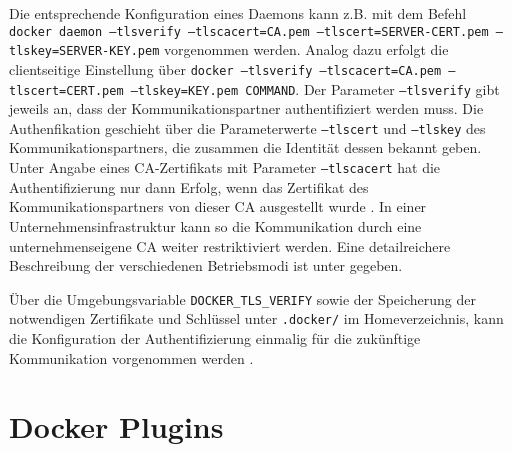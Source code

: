 \documentclass[../main.tex]{subfiles}
\begin{document}
    Die entsprechende Konfiguration eines Daemons kann z.B. mit dem Befehl \texttt{docker daemon --tlsverify --tlscacert=CA.pem --tlscert=SERVER-CERT.pem --tlskey=SERVER-KEY.pem} vorgenommen werden. Analog dazu erfolgt die clientseitige Einstellung über \texttt{docker --tlsverify --tlscacert=CA.pem --tlscert=CERT.pem --tlskey=KEY.pem COMMAND}. Der Parameter \texttt{--tlsverify} gibt jeweils an, dass der Kommunikationspartner authentifiziert werden muss. Die Authenfikation geschieht über die Parameterwerte \texttt{--tlscert} und \texttt{--tlskey} des Kommunikationspartners, die zusammen die Identität dessen bekannt geben. Unter Angabe eines CA-Zertifikats mit Parameter \texttt{--tlscacert} hat die Authentifizierung nur dann Erfolg, wenn das Zertifikat des Kommunikationspartners von dieser CA ausgestellt wurde \cite{dockerSecurityHTTPS}. In einer Unternehmensinfrastruktur kann so die Kommunikation durch eine unternehmenseigene CA weiter restriktiviert werden. Eine detailreichere Beschreibung der verschiedenen Betriebsmodi ist unter \cite{dockerSecurityHTTPS} gegeben.

    Über die Umgebungsvariable \texttt{DOCKER\_TLS\_VERIFY} sowie der Speicherung der notwendigen Zertifikate und Schlüssel unter \texttt{.docker/} im Homeverzeichnis, kann die Konfiguration der Authentifizierung einmalig für die zukünftige Kommunikation vorgenommen werden \cite{dockerSecurityHTTPS}.




  \section{Docker Plugins}
\end{document}
